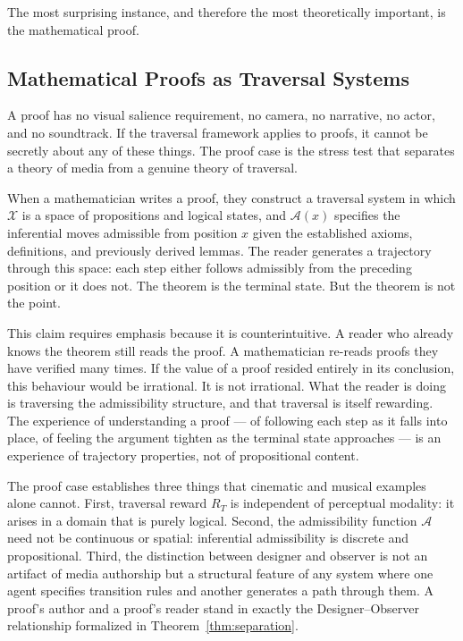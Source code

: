 \documentclass[12pt, a4paper]{article}
\theoremstyle{plain}
\theoremstyle{definition}
\theoremstyle{remark}
\newcommand{\X}{\mathcal{X}}
\newcommand{\A}{\mathcal{A}}
\newcommand{\reward}{R}
\begin{document}
The most surprising instance, and therefore the most
theoretically important, is the mathematical proof.

\subsection{Mathematical Proofs as Traversal Systems}
\label{subsec:proofs}

A proof has no visual salience requirement, no camera, no
narrative, no actor, and no soundtrack. If the traversal
framework applies to proofs, it cannot be secretly about
any of these things. The proof case is the stress test that
separates a theory of media from a genuine theory of
traversal.

When a mathematician writes a proof, they construct a
traversal system in which $\X$ is a space of propositions
and logical states, and $\A(x)$ specifies the inferential
moves admissible from position $x$ given the established
axioms, definitions, and previously derived lemmas. The
reader generates a trajectory through this space: each step
either follows admissibly from the preceding position or it
does not. The theorem is the terminal state. But the theorem
is not the point.

This claim requires emphasis because it is counterintuitive.
A reader who already knows the theorem still reads the proof.
A mathematician re-reads proofs they have verified many
times. If the value of a proof resided entirely in its
conclusion, this behaviour would be irrational. It is not
irrational. What the reader is doing is traversing the
admissibility structure, and that traversal is itself
rewarding. The experience of understanding a proof --- of
following each step as it falls into place, of feeling the
argument tighten as the terminal state approaches --- is an
experience of trajectory properties, not of propositional
content.

The proof case establishes three things that cinematic and
musical examples alone cannot. First, traversal reward
$\reward_T$ is independent of perceptual modality: it arises
in a domain that is purely logical. Second, the
admissibility function $\A$ need not be continuous or
spatial: inferential admissibility is discrete and
propositional. Third, the distinction between designer and
observer is not an artifact of media authorship but a
structural feature of any system where one agent specifies
transition rules and another generates a path through them.
A proof's author and a proof's reader stand in exactly the
Designer--Observer relationship formalized in
Theorem~\ref{thm:separation}.
\end{document}
